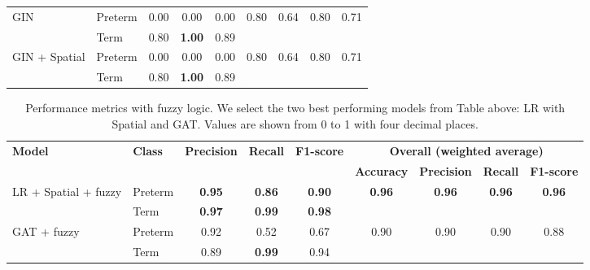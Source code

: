 \documentclass[doubleblind]{ecai}
\begin{document}
\begin{table}[h]
\begin{tabular}{ll|ccc|cccc}
        \hline
        \multirow{2}{*}{GIN}
            & Preterm & 0.00 & 0.00 & 0.00 &
            \multirow{2}{*}{0.80}&
            \multirow{2}{*}{0.64}&
            \multirow{2}{*}{0.80}&
            \multirow{2}{*}{0.71}\\
            & Term & 0.80 & \textbf{1.00} & 0.89 & 
            &
            &
            &
            \\
            \hline
        \multirow{2}{*}{GIN + Spatial}
            & Preterm & 0.00 & 0.00 & 0.00 &
            \multirow{2}{*}{0.80}&
            \multirow{2}{*}{0.64}&
            \multirow{2}{*}{0.80}&
            \multirow{2}{*}{0.71}\\
            & Term & 0.80 & \textbf{1.00} & 0.89 & 
            &
            &
            &
            \\
            \hline
    \end{tabular}
    \label{tab:classification_spatial}
\end{table}




\begin{table}[h]
    \centering
    \caption{Performance metrics with fuzzy logic. We select the two best performing models from Table above: LR with Spatial and GAT. Values are shown from 0 to 1 with four decimal places.}
    \vspace{0.1cm}
    \begin{tabular}{ll|ccc|cccc}
        \hline
        \textbf{Model} & \textbf{Class} & \textbf{Precision} & \textbf{Recall} & \textbf{F1-score}
            & \multicolumn{4}{c}{\textbf{Overall (weighted average)}} \\
        & & & & & \textbf{Accuracy} & \textbf{Precision} & \textbf{Recall} & \textbf{F1-score} \\
        \hline
        
        \multirow{2}{*}{LR + Spatial + fuzzy} 
            & Preterm    & \textbf{0.95}& \textbf{0.86}& \textbf{0.90}& \multirow{2}{*}{\textbf{0.96}}& \multirow{2}{*}{\textbf{0.96}}& \multirow{2}{*}{\textbf{0.96}}& \multirow{2}{*}{\textbf{0.96}}\\
            & Term       & \textbf{0.97}& \textbf{0.99}& \textbf{0.98}&  &  &  &  \\
        \hline
        \multirow{2}{*}{GAT + fuzzy} 
            & Preterm    & 0.92& 0.52& 0.67& \multirow{2}{*}{0.90}& \multirow{2}{*}{0.90}& \multirow{2}{*}{0.90}& \multirow{2}{*}{0.88}\\
            & Term       & 0.89& \textbf{0.99}& 0.94&  &  &  &  \\
        \hline
    \end{tabular}
    \label{tab:results_fuzzy}
    \vspace{0.05cm}
\end{table}
\end{document}
